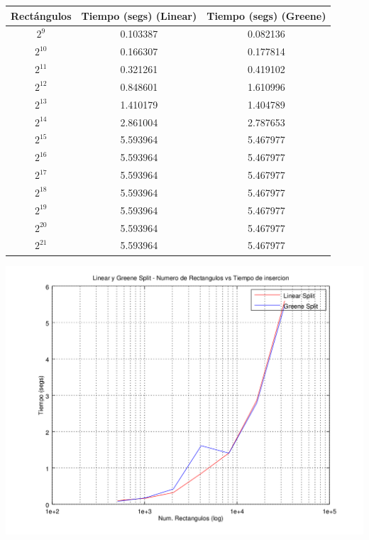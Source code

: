 \documentclass[letterpaper,10pt]{article}
\begin{document}
	\begin{center}

		\begin{tabular}{|c|c||c|}
			\hline
			Rectángulos	& Tiempo (segs) (Linear) & Tiempo (segs) (Greene) \\
			\hline
			$2^{9}$ 	& 0.103387	& 0.082136\\
			\hline
			$2^{10}$ 	& 0.166307	& 0.177814\\
			\hline
			$2^{11}$ 	& 0.321261	& 0.419102\\
			\hline
			$2^{12}$ 	& 0.848601	& 1.610996\\
			\hline
			$2^{13}$ 	& 1.410179	& 1.404789\\
			\hline
			$2^{14}$ 	& 2.861004	& 2.787653\\
			\hline
			$2^{15}$ 	& 5.593964	& 5.467977\\
			\hline
			$2^{16}$ 	& 5.593964	& 5.467977\\
			\hline
			$2^{17}$ 	& 5.593964	& 5.467977\\
			\hline
			$2^{18}$ 	& 5.593964	& 5.467977\\
			\hline
			$2^{19}$ 	& 5.593964	& 5.467977\\
			\hline
			$2^{20}$ 	& 5.593964	& 5.467977\\
			\hline
			$2^{21}$ 	& 5.593964	& 5.467977\\
			\hline
		\end{tabular}

		\includegraphics[width=0.75\textheight]{fig1.png}
	\end{center}

	\newpage
\end{document}
